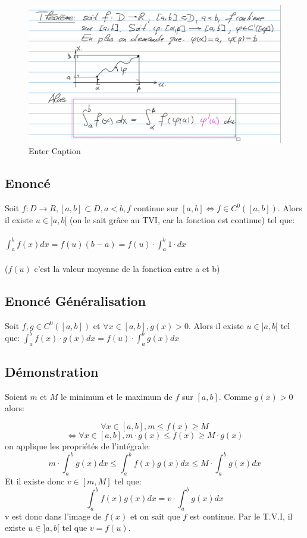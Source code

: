 \documentclass{article}
\begin{document}
\begin{figure}
    \centering
    \includegraphics[width=0.8\linewidth]{image.png}
    \caption{Enter Caption}
    \label{fig:enter-label}
\end{figure}

\subsection{Enoncé}

Soit $ f: D \to R, [a, b] \subset D, a < b, f $ continue sur $ [a, b] \Leftrightarrow f \in C^0([a, b])$. Alors il existe $ u \in ]a, b[$ (on le sait grâce au TVI, car la fonction est continue) tel que:\\\\
$ \int_{a}^bf(x)dx = f(u)(b - a) = f(u) \cdot \int_{a}^b 1\cdot dx$\\\\
($f(u)$ c'est la valeur moyenne de la fonction entre a et b)

\subsection{Enoncé Généralisation}

Soit $ f, g \in C^0([a, b]) $ et $ \forall x \in [a, b], g(x) > 0. $ Alors il existe $ u \in ]a, b[ $ tel que:
$ \int_{a}^b f(x)\cdot g(x)dx = f(u) \cdot \int_{a}^b g(x)dx$

\subsection{Démonstration}

Soient $ m $ et $ M $ le minimum et le maximum de $ f $ sur $ [a, b] $. Comme $ g(x) > 0 $ alors:

\[ \forall x \in [a, b], m \leq f(x) \geq M \]
\[ \Leftrightarrow \forall x \in [a, b], m \cdot g(x) \leq f(x) \geq M \cdot g(x) \]
on applique les propriétés de l'intégrale:
\[ m \cdot \int_{a}^b g(x)dx \leq \int_{a}^b f(x)g(x)dx \leq M \cdot \int_{a}^b g(x)dx \]
Et il existe donc $ v \in [m, M] $ tel que:
\[ \int_{a}^b f(x)g(x)dx = v \cdot \int_{a}^b g(x)dx \]
v est donc dans l'image de $ f(x) $ et on sait que $ f $ est continue. Par le T.V.I, il existe $ u \in ]a, b[ $ tel que $ v = f(u) $.
\end{document}
